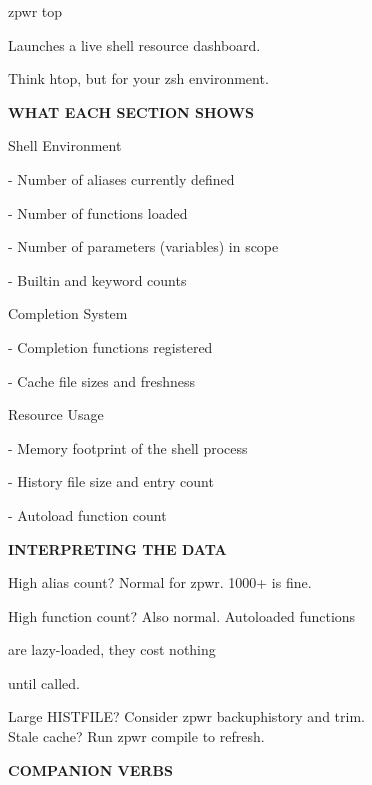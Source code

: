 \documentclass[11pt,a4paper,twoside]{book}
\begin{document}
\begin{codebox}
zpwr top\\
\end{codebox}

Launches a live shell resource dashboard.

Think htop, but for your zsh environment.


\vspace{12pt}
{\bfseries\color{neonyellow} WHAT EACH SECTION SHOWS}\vspace{4pt}

Shell Environment

- Number of aliases currently defined

- Number of functions loaded

- Number of parameters (variables) in scope

- Builtin and keyword counts

Completion System

- Completion functions registered

- Cache file sizes and freshness

Resource Usage

- Memory footprint of the shell process

- History file size and entry count

- Autoload function count


\vspace{12pt}
{\bfseries\color{neonyellow} INTERPRETING THE DATA}\vspace{4pt}

\begin{codebox}
High alias count?    Normal for zpwr. 1000+ is fine.\\
\end{codebox}

High function count? Also normal. Autoloaded functions

are lazy-loaded, they cost nothing

until called.

\begin{codebox}
Large HISTFILE?      Consider zpwr backuphistory and trim.\\
Stale cache?         Run zpwr compile to refresh.\\
\end{codebox}


\vspace{12pt}
{\bfseries\color{neonyellow} COMPANION VERBS}\vspace{4pt}
\end{document}
